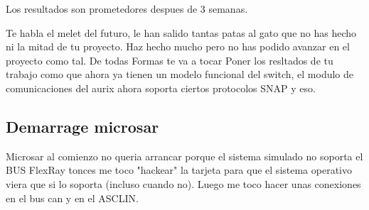 Los resultados son prometedores despues de 3 semanas.

Te habla el melet del futuro, le han salido tantas patas al gato que no has hecho ni la mitad de tu proyecto. Haz hecho mucho pero no has podido avanzar en el proyecto como tal. De todas Formas te va a tocar Poner los resltados de tu trabajo como que ahora ya tienen un modelo funcional del switch, el modulo de comunicaciones del aurix ahora soporta ciertos protocolos SNAP y eso.

\subsection{Demarrage microsar}
Microsar al comienzo no queria arrancar porque el sistema simulado no soporta el BUS FlexRay tonces me toco "hackear" la tarjeta para que el sistema operativo viera que si lo soporta (incluso cuando no). Luego me toco hacer unas conexiones en el bus can y en el ASCLIN. 
